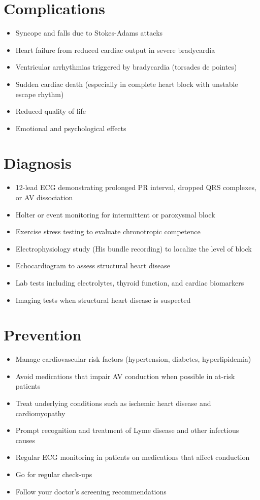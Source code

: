 \section{Complications}

\begin{itemize}[noitemsep]
  \item Syncope and falls due to Stokes-Adams attacks
  \item Heart failure from reduced cardiac output in severe bradycardia
  \item Ventricular arrhythmias triggered by bradycardia (torsades de pointes)
  \item Sudden cardiac death (especially in complete heart block with unstable escape rhythm)
  \item Reduced quality of life
  \item Emotional and psychological effects
\end{itemize}

\section{Diagnosis}

\begin{itemize}[noitemsep]
  \item 12-lead ECG demonstrating prolonged PR interval, dropped QRS complexes, or AV dissociation
  \item Holter or event monitoring for intermittent or paroxysmal block
  \item Exercise stress testing to evaluate chronotropic competence
  \item Electrophysiology study (His bundle recording) to localize the level of block
  \item Echocardiogram to assess structural heart disease
  \item Lab tests including electrolytes, thyroid function, and cardiac biomarkers
  \item Imaging tests when structural heart disease is suspected
\end{itemize}

\section{Prevention}

\begin{itemize}[noitemsep]
  \item Manage cardiovascular risk factors (hypertension, diabetes, hyperlipidemia)
  \item Avoid medications that impair AV conduction when possible in at-risk patients
  \item Treat underlying conditions such as ischemic heart disease and cardiomyopathy
  \item Prompt recognition and treatment of Lyme disease and other infectious causes
  \item Regular ECG monitoring in patients on medications that affect conduction
  \item Go for regular check-ups
  \item Follow your doctor's screening recommendations
\end{itemize}

